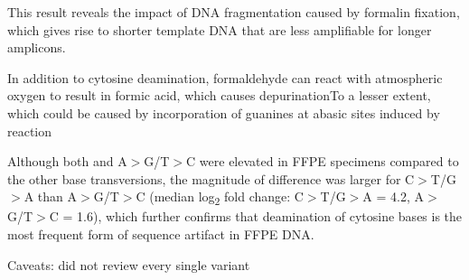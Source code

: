 This result reveals the impact of DNA fragmentation caused by formalin fixation, which gives rise to shorter template DNA that are less amplifiable for longer amplicons.

In addition to cytosine deamination, formaldehyde can react with atmospheric oxygen to result in formic acid, which causes depurinationTo a lesser extent, which could be caused by incorporation of guanines at abasic sites induced by reaction

Although both  and A$>$G/T$>$C were elevated in FFPE specimens compared to the other base transversions, the magnitude of difference was larger for C$>$T/G$>$A than A$>$G/T$>$C (median log\textsubscript{2} fold change: C$>$T/G$>$A = 4.2, A$>$G/T$>$C = 1.6), which further confirms that deamination of cytosine bases is the most frequent form of sequence artifact in FFPE DNA.


Caveats: did not review every single variant
